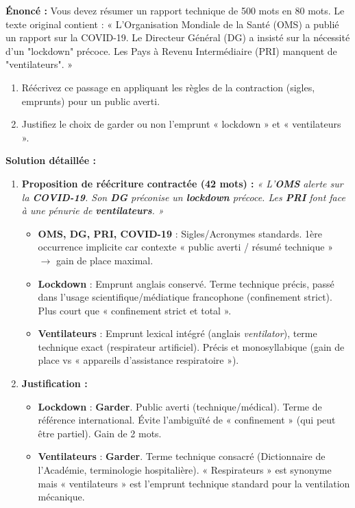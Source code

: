 \documentclass[11pt]{article}
\begin{document}
\begin{exoresolu}
    \textbf{Énoncé :} Vous devez résumer un rapport technique de 500 mots en 80 mots. Le texte original contient : « L'Organisation Mondiale de la Santé (OMS) a publié un rapport sur la COVID-19. Le Directeur Général (DG) a insisté sur la nécessité d'un "lockdown" précoce. Les Pays à Revenu Intermédiaire (PRI) manquent de "ventilateurs". »
    \begin{enumerate}
        \item Réécrivez ce passage en appliquant les règles de la contraction (sigles, emprunts) pour un public averti.
        \item Justifiez le choix de garder ou non l'emprunt « lockdown » et « ventilateurs ».
    \end{enumerate}
    \tcblower
    \textbf{Solution détaillée :}
    \begin{enumerate}
        \item \textbf{Proposition de réécriture contractée (42 mots) :}
            \emph{« L'\textbf{OMS} alerte sur la \textbf{COVID-19}. Son \textbf{DG} préconise un \textbf{lockdown} précoce. Les \textbf{PRI} font face à une pénurie de \textbf{ventilateurs}. »}
            \begin{itemize}
                \item \textbf{OMS, DG, PRI, COVID-19} : Sigles/Acronymes standards. 1ère occurrence implicite car contexte « public averti / résumé technique » $\rightarrow$ gain de place maximal.
                \item \textbf{Lockdown} : Emprunt anglais conservé. Terme technique précis, passé dans l'usage scientifique/médiatique francophone (confinement strict). Plus court que « confinement strict et total ».
                \item \textbf{Ventilateurs} : Emprunt lexical intégré (anglais \emph{ventilator}), terme technique exact (respirateur artificiel). Précis et monosyllabique (gain de place vs « appareils d'assistance respiratoire »).
            \end{itemize}
        \item \textbf{Justification :}
            \begin{itemize}
                \item \textbf{Lockdown} : \textbf{Garder}. Public averti (technique/médical). Terme de référence international. Évite l'ambiguïté de « confinement » (qui peut être partiel). Gain de 2 mots.
                \item \textbf{Ventilateurs} : \textbf{Garder}. Terme technique consacré (Dictionnaire de l'Académie, terminologie hospitalière). « Respirateurs » est synonyme mais « ventilateurs » est l'emprunt technique standard pour la ventilation mécanique.

\end{itemize}
\end{enumerate}
\end{exoresolu}
\end{document}

